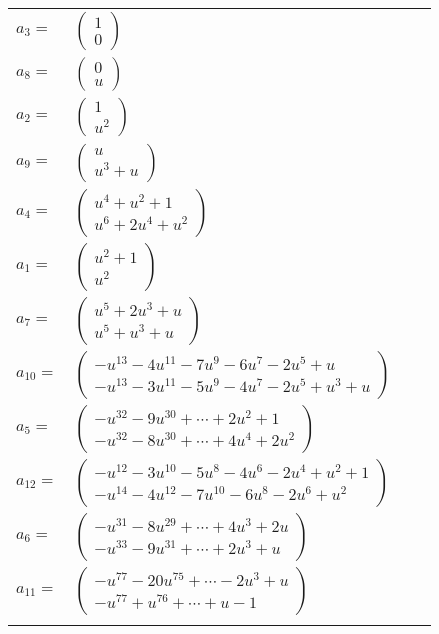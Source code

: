 \documentclass[1p]{elsarticle_modified}
\theoremstyle{definition}
\begin{document}
\begin{tabular}{m{7pt} m{180pt} m{7pt} m{180pt} }
\flushright $a_{3}=$&$\begin{pmatrix}1\\0\end{pmatrix}$ \\
\flushright $a_{8}=$&$\begin{pmatrix}0\\u\end{pmatrix}$ \\
\flushright $a_{2}=$&$\begin{pmatrix}1\\u^2\end{pmatrix}$ \\
\flushright $a_{9}=$&$\begin{pmatrix}u\\u^3+u\end{pmatrix}$ \\
\flushright $a_{4}=$&$\begin{pmatrix}u^4+u^2+1\\u^6+2 u^4+u^2\end{pmatrix}$ \\
\flushright $a_{1}=$&$\begin{pmatrix}u^2+1\\u^2\end{pmatrix}$ \\
\flushright $a_{7}=$&$\begin{pmatrix}u^5+2 u^3+u\\u^5+u^3+u\end{pmatrix}$ \\
\flushright $a_{10}=$&$\begin{pmatrix}- u^{13}-4 u^{11}-7 u^9-6 u^7-2 u^5+u\\- u^{13}-3 u^{11}-5 u^9-4 u^7-2 u^5+u^3+u\end{pmatrix}$ \\
\flushright $a_{5}=$&$\begin{pmatrix}- u^{32}-9 u^{30}+\cdots+2 u^2+1\\- u^{32}-8 u^{30}+\cdots+4 u^4+2 u^2\end{pmatrix}$ \\
\flushright $a_{12}=$&$\begin{pmatrix}- u^{12}-3 u^{10}-5 u^8-4 u^6-2 u^4+u^2+1\\- u^{14}-4 u^{12}-7 u^{10}-6 u^8-2 u^6+u^2\end{pmatrix}$ \\
\flushright $a_{6}=$&$\begin{pmatrix}- u^{31}-8 u^{29}+\cdots+4 u^3+2 u\\- u^{33}-9 u^{31}+\cdots+2 u^3+u\end{pmatrix}$ \\
\flushright $a_{11}=$&$\begin{pmatrix}- u^{77}-20 u^{75}+\cdots-2 u^3+u\\- u^{77}+u^{76}+\cdots+u-1\end{pmatrix}$\\&\end{tabular}
\end{document}
